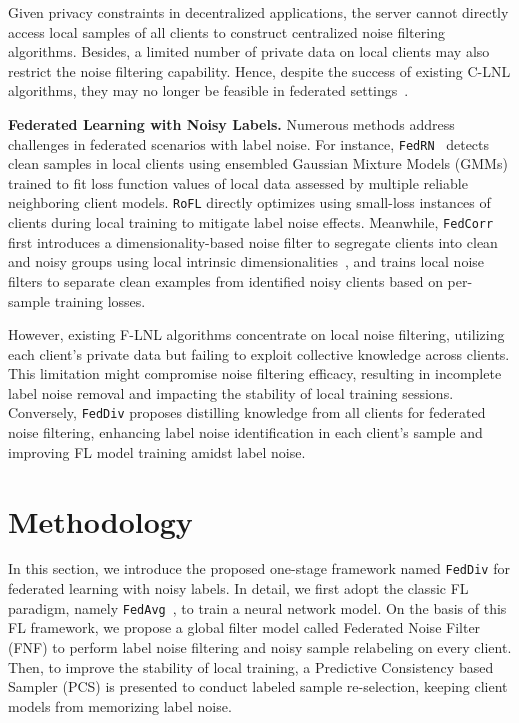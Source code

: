 \documentclass[letterpaper]{article} %
\begin{document}
Given privacy constraints in decentralized applications, the server cannot directly access local samples of all clients to construct centralized noise filtering algorithms. Besides, a limited number of private data on local clients may also restrict the noise filtering capability. Hence, despite the success of existing C-LNL algorithms, they may no longer be feasible in federated settings~\cite{xu2022fedcorr}.

\noindent
\textbf{Federated Learning with Noisy Labels.}
Numerous methods address challenges in federated scenarios with label noise. For instance, \texttt{FedRN}~\cite{kim2022fedrn} detects clean samples in local clients using ensembled Gaussian Mixture Models (GMMs) trained to fit loss function values of local data assessed by multiple reliable neighboring client models. \texttt{RoFL} \cite{RoFL} directly optimizes using small-loss instances of clients during local training to mitigate label noise effects. Meanwhile, \texttt{FedCorr}\cite{xu2022fedcorr} first introduces a dimensionality-based noise filter to segregate clients into clean and noisy groups using local intrinsic dimensionalities~\cite{LID}, and trains local noise filters to separate clean examples from identified noisy clients based on per-sample training losses.

However, existing F-LNL algorithms concentrate on local noise filtering, utilizing each client's private data but failing to exploit collective knowledge across clients. This limitation might compromise noise filtering efficacy, resulting in incomplete label noise removal and impacting the stability of local training sessions. Conversely, \texttt{FedDiv} proposes distilling knowledge from all clients for federated noise filtering, enhancing label noise identification in each client's sample and improving FL model training amidst label noise.

\section{Methodology}

In this section, we introduce the proposed one-stage framework named \texttt{FedDiv} for federated learning with noisy labels. In detail, we first adopt the classic FL paradigm, namely \texttt{FedAvg}~\cite{FedAvg}, to train a neural network model. On the basis of this FL framework, we propose a global filter model called Federated Noise Filter (FNF) to perform label noise filtering and noisy sample relabeling on every client. Then, to improve the stability of local training, a Predictive Consistency based Sampler (PCS) is presented to conduct labeled sample re-selection, keeping client models from memorizing label noise.
\end{document}
